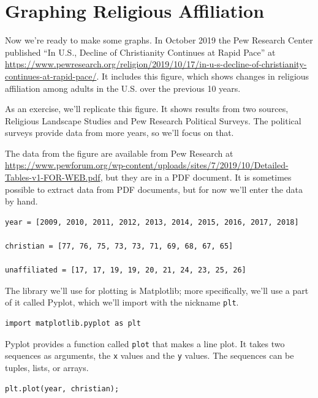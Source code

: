 \hypertarget{graphing-religious-affiliation}{%
\section{Graphing Religious
Affiliation}\label{graphing-religious-affiliation}}

Now we're ready to make some graphs. In October 2019 the Pew Research
Center published ``In U.S., Decline of Christianity Continues at Rapid
Pace'' at
\url{https://www.pewresearch.org/religion/2019/10/17/in-u-s-decline-of-christianity-continues-at-rapid-pace/}.
It includes this figure, which shows changes in religious affiliation
among adults in the U.S. over the previous 10 years.

As an exercise, we'll replicate this figure. It shows results from two
sources, Religious Landscape Studies and Pew Research Political Surveys.
The political surveys provide data from more years, so we'll focus on
that.

The data from the figure are available from Pew Research at
\url{https://www.pewforum.org/wp-content/uploads/sites/7/2019/10/Detailed-Tables-v1-FOR-WEB.pdf},
but they are in a PDF document. It is sometimes possible to extract data
from PDF documents, but for now we'll enter the data by hand.

\begin{lstlisting}[]
year = [2009, 2010, 2011, 2012, 2013, 2014, 2015, 2016, 2017, 2018]

christian = [77, 76, 75, 73, 73, 71, 69, 68, 67, 65]

unaffiliated = [17, 17, 19, 19, 20, 21, 24, 23, 25, 26]
\end{lstlisting}

The library we'll use for plotting is Matplotlib; more specifically,
we'll use a part of it called Pyplot, which we'll import with the
nickname \passthrough{\lstinline!plt!}.

\begin{lstlisting}[]
import matplotlib.pyplot as plt
\end{lstlisting}

Pyplot provides a function called \passthrough{\lstinline!plot!} that
makes a line plot. It takes two sequences as arguments, the
\passthrough{\lstinline!x!} values and the \passthrough{\lstinline!y!}
values. The sequences can be tuples, lists, or arrays.

\begin{lstlisting}[]
plt.plot(year, christian);
\end{lstlisting}

